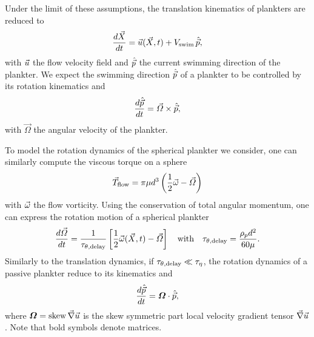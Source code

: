 Under the limit of these assumptions, the translation kinematics of plankters are reduced to
\begin{equation}\label{eq:translation}
	\frac{d \vec{X}}{dt} = \vec{u} (\vec{X}, t) + V_{\mathrm{swim}} \, \hat{\vec{p}},
\end{equation}
with $\vec{u}$ the flow velocity field and $\hat{\vec{p}}$ the current swimming direction of the plankter.
We expect the swimming direction $\hat{\vec{p}}$ of a plankter to be controlled by its rotation kinematics and
\begin{equation}\label{eq:translation}
	\frac{d \hat{\vec{p}}}{dt} = \vec{\varOmega} \times \hat{\vec{p}},
\end{equation}
with $\vec{\varOmega}$ the angular velocity of the plankter.

To model the rotation dynamics of the spherical plankter we consider, one can similarly compute the viscous torque on a sphere \citep{lamb1945hydrodynamics}
\begin{equation}\label{eq:translation}
	\vec{T}_{\mathrm{flow}} = \pi \mu d^3 \left( \frac{1}{2} \vec{\omega} - \vec{\varOmega} \right)
\end{equation}
with $\vec{\omega}$ the flow vorticity.
Using the conservation of total angular momentum, one can express the rotation motion of a spherical plankter
\begin{equation}\label{eq:stokes_rotation}
	\frac{d \vec{\varOmega}}{d t} = \frac{1}{\tau_{\theta,\mathrm{delay}}} \left[ \frac{1}{2} \vec{\omega}(\vec{X}, t) - \vec{\varOmega} \right] \quad \text{with} \quad \tau_{\theta,\mathrm{delay}} = \frac{\rho_p d^2}{60 \mu}.
\end{equation}
Similarly to the translation dynamics, if $\tau_{\theta,\mathrm{delay}} \ll \tau_{\eta}$, the rotation dynamics of a passive plankter reduce to its kinematics and
\begin{equation}
	\frac{d \hat{\vec{p}}}{d t} = \boldsymbol{\varOmega} \cdot \hat{\vec{p}},
\end{equation}
where $\boldsymbol{\varOmega} = \operatorname{skew} \vec{\nabla} \vec{u}$ is the skew symmetric part local velocity gradient tensor $\vec{\nabla} \vec{u}$.
Note that bold symbols denote matrices.

